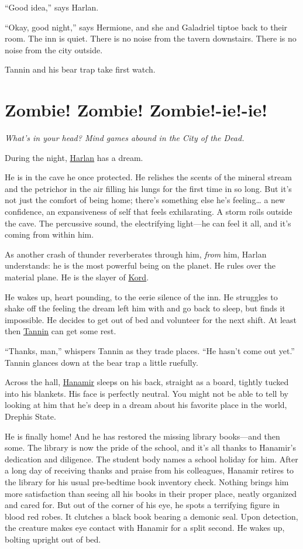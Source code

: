 \documentclass[smalldemyvopaper,11pt,twoside,onecolumn,openright,extrafontsizes]{memoir}
\newcommand{\chapdesc}[1]{
    \begin{flushright}
    \emph{{#1}}
    \end{flushright}
    \vspace{26pt}
}
\begin{document}
``Good idea,'' says Harlan.

``Okay, good night,'' says Hermione, and she and Galadriel tiptoe back
to their room. The inn is quiet. There is no noise from the tavern
downstairs. There is no noise from the city outside.

Tannin and his bear trap take first watch.


\chapter{Zombie! Zombie! Zombie!-ie!-ie!}
\chapdesc{What's in your head? Mind games abound in the City of the Dead.}

During the night, \href{/characters/harlan/}{Harlan} has a dream.

He is in the cave he once protected. He relishes the scents of the
mineral stream and the petrichor in the air filling his lungs for the
first time in so long. But it's not just the comfort of being home;
there's something else he's feeling\ldots{} a new confidence, an
expansiveness of self that feels exhilarating. A storm roils outside the
cave. The percussive sound, the electrifying light---he can feel it all,
and it's coming from within him.

As another crash of thunder reverberates through him, \emph{from} him,
Harlan understands: he is the most powerful being on the planet. He
rules over the material plane. He is the slayer of
\href{/characters/kord/}{Kord}.

He wakes up, heart pounding, to the eerie silence of the inn. He
struggles to shake off the feeling the dream left him with and go back
to sleep, but finds it impossible. He decides to get out of bed and
volunteer for the next shift. At least then
\href{/characters/tannin/}{Tannin} can get some rest.

``Thanks, man,'' whispers Tannin as they trade places. ``He hasn't come
out yet.'' Tannin glances down at the bear trap a little ruefully.

Across the hall, \href{/characters/hanamir/}{Hanamir} sleeps on his
back, straight as a board, tightly tucked into his blankets. His face is
perfectly neutral. You might not be able to tell by looking at him that
he's deep in a dream about his favorite place in the world, Drephis
State.

He is finally home! And he has restored the missing library books---and
then some. The library is now the pride of the school, and it's all
thanks to Hanamir's dedication and diligence. The student body names a
school holiday for him. After a long day of receiving thanks and praise
from his colleagues, Hanamir retires to the library for his usual
pre-bedtime book inventory check. Nothing brings him more satisfaction
than seeing all his books in their proper place, neatly organized and
cared for. But out of the corner of his eye, he spots a terrifying
figure in blood red robes. It clutches a black book bearing a demonic
seal. Upon detection, the creature makes eye contact with Hanamir for a
split second. He wakes up, bolting upright out of bed.
\end{document}
